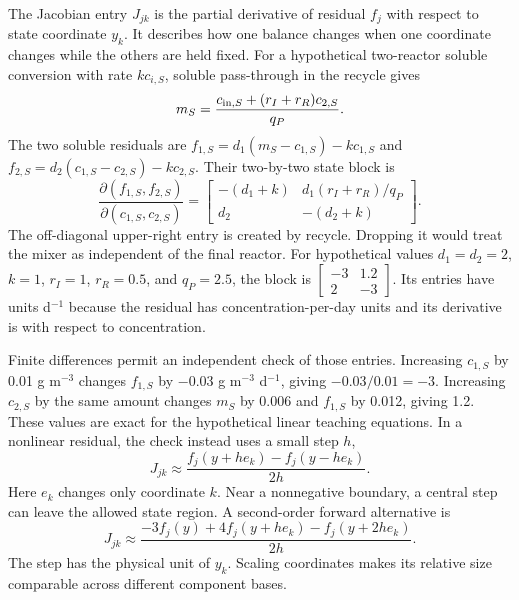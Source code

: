 The Jacobian entry $J_{jk}$ is the partial derivative of residual $f_j$ with respect to state coordinate $y_k$. It describes how one balance changes when one coordinate changes while the others are held fixed. For a hypothetical two-reactor soluble conversion with rate $kc_{i,S}$, soluble pass-through in the recycle gives
\begin{equation}
m_S=\frac{c_{{\rm in},S}+(r_I+r_R)c_{2,S}}{q_P}.
\end{equation}
The two soluble residuals are $f_{1,S}=d_1(m_S-c_{1,S})-kc_{1,S}$ and $f_{2,S}=d_2(c_{1,S}-c_{2,S})-kc_{2,S}$. Their two-by-two state block is
\begin{equation}
\frac{\partial(f_{1,S},f_{2,S})}{\partial(c_{1,S},c_{2,S})}
=\begin{bmatrix}
-(d_1+k)&d_1(r_I+r_R)/q_P\\
d_2&-(d_2+k)
\end{bmatrix}.
\end{equation}
The off-diagonal upper-right entry is created by recycle. Dropping it would treat the mixer as independent of the final reactor. For hypothetical values $d_1=d_2=2$, $k=1$, $r_I=1$, $r_R=0.5$, and $q_P=2.5$, the block is $\begin{bmatrix}-3&1.2\\2&-3\end{bmatrix}$. Its entries have units d$^{-1}$ because the residual has concentration-per-day units and its derivative is with respect to concentration.

Finite differences permit an independent check of those entries. Increasing $c_{1,S}$ by 0.01 g m$^{-3}$ changes $f_{1,S}$ by $-0.03$ g m$^{-3}$ d$^{-1}$, giving $-0.03/0.01=-3$. Increasing $c_{2,S}$ by the same amount changes $m_S$ by 0.006 and $f_{1,S}$ by 0.012, giving 1.2. These values are exact for the hypothetical linear teaching equations. In a nonlinear residual, the check instead uses a small step $h$,
\begin{equation}
J_{jk}\approx\frac{f_j(y+he_k)-f_j(y-he_k)}{2h}.
\end{equation}
Here $e_k$ changes only coordinate $k$. Near a nonnegative boundary, a central step can leave the allowed state region. A second-order forward alternative is
\begin{equation}
J_{jk}\approx\frac{-3f_j(y)+4f_j(y+he_k)-f_j(y+2he_k)}{2h}.
\end{equation}
The step has the physical unit of $y_k$. Scaling coordinates makes its relative size comparable across different component bases.

